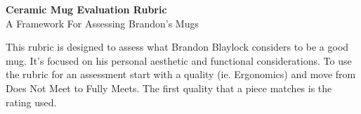 \documentclass[11pt]{article}
\begin{document}
\begin{center}
	{\LARGE \textbf{Ceramic Mug Evaluation Rubric}} \\[0.5em]
	{\large A Framework For Assessing Brandon's Mugs}
\end{center}

\vspace{0.5em}

\noindent
This rubric is designed to assess what Brandon Blaylock considers to be a good
mug. It's focused on his personal aesthetic and functional considerations. To
use the rubric for an assessment start with a quality (ie. Ergonomics) and move
from Does Not Meet to Fully Meets. The first quality that a piece matches is the
rating used.

\vspace{1.5em}
\end{document}
